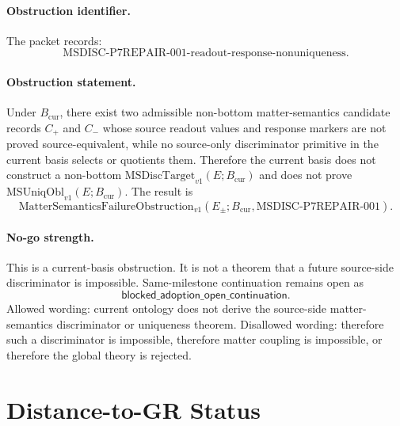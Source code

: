 \paragraph{Obstruction identifier.}
The packet records:
\[
  \mathrm{MSDISC\mbox{-}P7REPAIR\mbox{-}001\mbox{-}
  readout\mbox{-}response\mbox{-}nonuniqueness}.
\]

\paragraph{Obstruction statement.}
Under \(B_{\mathrm{cur}}\), there exist two admissible non-bottom
matter-semantics candidate records \(C_+\) and \(C_-\) whose source readout
values and response markers are not proved source-equivalent, while no
source-only discriminator primitive in the current basis selects or quotients
them.  Therefore the current basis does not construct a non-bottom
\(\mathrm{MSDiscTarget}_{v1}(E;B_{\mathrm{cur}})\) and does not prove
\(\mathrm{MSUniqObl}_{v1}(E;B_{\mathrm{cur}})\).  The result is
\[
  \mathrm{MatterSemanticsFailureObstruction}_{v1}
  (E_{\pm};B_{\mathrm{cur}},
  \mathrm{MSDISC\mbox{-}P7REPAIR\mbox{-}001}).
\]

\paragraph{No-go strength.}
This is a current-basis obstruction.  It is not a theorem that a future
source-side discriminator is impossible.  Same-milestone continuation remains
open as
\[
  \mathsf{blocked\_adoption\_open\_continuation}.
\]
Allowed wording: current ontology does not derive the source-side
matter-semantics discriminator or uniqueness theorem.  Disallowed wording:
therefore such a discriminator is impossible, therefore matter coupling is
impossible, or therefore the global theory is rejected.

\section{Distance-to-GR Status}

